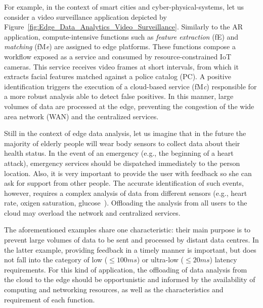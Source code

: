 For example, in the context of smart cities and cyber-physical-systems, let us consider a video surveillance application depicted by Figure~\ref{fig:Edge_Data_Analytics_Video_Surveillance}. Similarly to the AR application, compute-intensive functions such as \textit{feature extraction} (fE) and \textit{matching} (fM\textit{e}) are assigned to edge platforms.
These functions compose a workflow exposed as a service and consumed by resource-constrained IoT cameras. This service receives video frames at short intervals, from which it extracts facial features matched against a police catalog (PC). A positive identification triggers the execution of a cloud-based service (fM\textit{c}) responsible for a more robust analysis able to detect false positives. In this manner, large volumes of data are processed at the edge, preventing the congestion of the wide area network (WAN) and the centralized services.



Still in the context of edge data analysis, 
let us imagine that in the future the majority of elderly people will wear body sensors to collect data about their health status. In the event of an emergency (e.g., the beginning of a heart attack), emergency services should be dispatched immediately to the person location. Also, it is very important to provide the user with feedback so she can ask for support from other people.
The accurate identification of such events, however, requires a complex analysis of data from different sensors (e.g., heart rate, oxigen saturation, glucose~\cite{Li:2017}). Offloading the analysis from all users to the cloud may overload the network and centralized services. %

The aforementioned examples share one characteristic: their main purpose is to prevent large volumes of data to be sent and processed by distant data centres. In the latter example, providing feedback in a timely manner is important, but does not fall into the category of low ($\leq 100ms$) or ultra-low ($\leq 20ms$) latency requirements. For this kind of application, the offloading of data analysis from the cloud to the edge should be opportunistic and informed by the availability of computing and networking resources, as well as the characteristics and requirement of each function.

